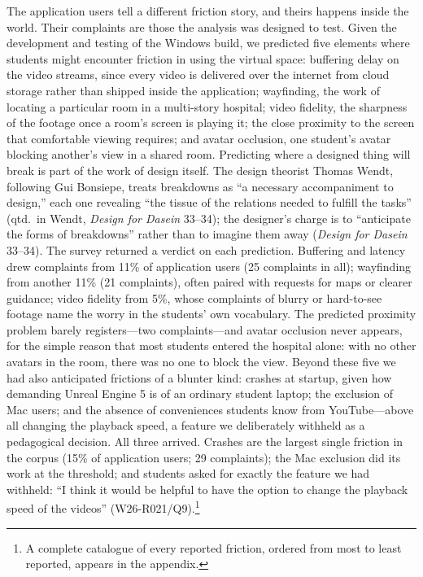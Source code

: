 The application users tell a different friction story, and theirs happens
inside the world. Their complaints are those the analysis was designed to
test. Given the development and testing of the Windows build, we predicted
five elements where students might encounter friction in using the virtual
space: buffering delay on the video streams, since every video is delivered
over the internet from cloud storage rather than shipped inside the
application; wayfinding, the work of locating a particular room in a
multi-story hospital; video fidelity, the sharpness of the footage once a
room's screen is playing it; the close proximity to the screen that
comfortable viewing requires; and avatar occlusion, one student's avatar
blocking another's view in a shared room. Predicting where a designed thing
will break is part of the work of design itself. The design theorist Thomas
Wendt, following Gui Bonsiepe, treats breakdowns as ``a necessary
accompaniment to design,'' each one revealing ``the tissue of the relations
needed to fulfill the tasks'' (qtd.\ in Wendt, \textit{Design for Dasein}
33--34); the designer's charge is to ``anticipate the forms of breakdowns''
rather than to imagine them away (\textit{Design for Dasein} 33--34). The
survey returned a verdict on each prediction. Buffering and latency drew
complaints from 11\% of application users (25 complaints in all);
wayfinding from another 11\% (21 complaints), often paired with
requests for maps or clearer guidance; video fidelity from 5\%, whose
complaints of blurry or hard-to-see footage name the worry in the students'
own vocabulary. The predicted proximity problem barely registers---two
complaints---and avatar occlusion never appears, for the simple reason that
most students entered the hospital alone: with no other avatars in the room,
there was no one to block the view. Beyond these five we had also
anticipated frictions of a blunter kind: crashes at startup, given how
demanding Unreal Engine 5 is of an ordinary student laptop; the exclusion of
Mac users; and the absence of conveniences students know from
YouTube---above all changing the playback speed, a feature we deliberately
withheld as a pedagogical decision. All three arrived. Crashes are the
largest single friction in the corpus (15\% of application users; 29
complaints); the Mac exclusion did its work at the threshold; and students
asked for exactly the feature we had withheld: ``I think it would be helpful
to have the option to change the playback speed of the videos''
(W26-R021/Q9).\footnote{A complete catalogue of every reported friction,
ordered from most to least reported, appears in the appendix.}

